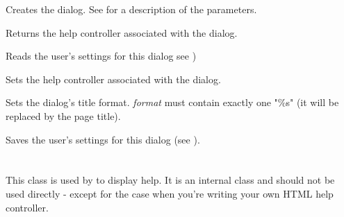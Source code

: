 Creates the dialog. See 
for a description of the parameters.

\label{wxhtmlhelpdialoggetcontroller}


Returns the help controller associated with the dialog.

\label{wxhtmlhelpdialogreadcustomization}


Reads the user's settings for this dialog see )

\label{wxhtmlhelpdialogsetcontroller}


Sets the help controller associated with the dialog.

\label{wxhtmlhelpdialogsettitleformat}


Sets the dialog's title format. {\it format} must contain exactly one "\%s"
(it will be replaced by the page title).

\label{wxhtmlhelpdialogwritecustomization}


Saves the user's settings for this dialog (see ).

\section{}\label{wxhtmlhelpframe}

This class is used by  
to display help.
It is an internal class and should not be used directly - except for the case
when you're writing your own HTML help controller.

